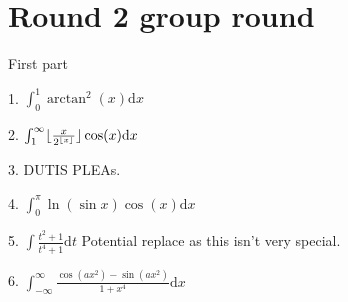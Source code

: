 \documentclass{article}
\DeclarePairedDelimiter{\floor}{\lfloor}{\rfloor}
\newcommand{\dd}{\mathrm{d}}
\begin{document}
\section{Round 2 group round}

First part





1. $\int_0^1 \arctan^2(x) \dd x$ \newline  \newline \newline 

2. $\int_1^{\infty} \floor{\frac{x}{2^{\floor{x}}}} \cos(x) \dd x$

3. DUTIS PLEAs. 

4. $\int_0^{\pi} \ln(\sin{x})\cos(x) \dd x$

5. $\int \frac{t^2+1}{t^4+1} \dd t$ Potential replace as this isn't very special. \newline  \newline \newline 

6. $\int_{-\infty}^{\infty} \frac{\cos(ax^2)-\sin(ax^2)}{1+x^4} \dd x$ \newline  \newline \newline 
\end{document}
